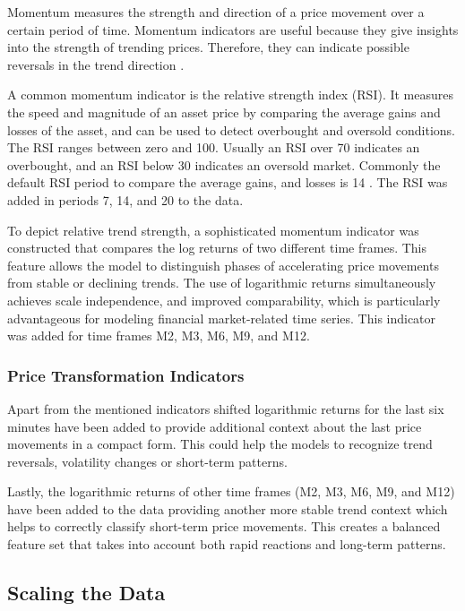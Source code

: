 Momentum measures the strength and direction of a price movement over a certain period of time.
Momentum indicators are useful because they give insights into the strength of trending prices.
Therefore, they can indicate possible reversals in the trend direction \cite{investopia-momentum}.

A common momentum indicator is the relative strength index (RSI).
It measures the speed and magnitude of an asset price by comparing the average gains and losses of the asset, and can be used to detect overbought and oversold conditions.
The RSI ranges between zero and 100.
Usually an RSI over 70 indicates an overbought, and an RSI below 30 indicates an oversold market.
Commonly the default RSI period to compare the average gains, and losses is 14 \cite{investopia-rsi}.
The RSI was added in periods 7, 14, and 20 to the data.

To depict relative trend strength, a sophisticated momentum indicator was constructed that compares the log returns of two different time frames.
This feature allows the model to distinguish phases of accelerating price movements from stable or declining trends.
The use of logarithmic returns simultaneously achieves scale independence, and improved comparability, which is particularly advantageous for modeling financial market-related time series.
This indicator was added for time frames M2, M3, M6, M9, and M12.

\subsubsection{Price Transformation Indicators}

Apart from the mentioned indicators shifted logarithmic returns for the last six minutes have been added to provide additional context about the last price movements in a compact form.
This could help the models to recognize trend reversals, volatility changes or short-term patterns.

Lastly, the logarithmic returns of other time frames (M2, M3, M6, M9, and M12) have been added to the data providing another more stable trend context which helps to correctly classify short-term price movements.
This creates a balanced feature set that takes into account both rapid reactions and long-term patterns.

\subsection{Scaling the Data}

